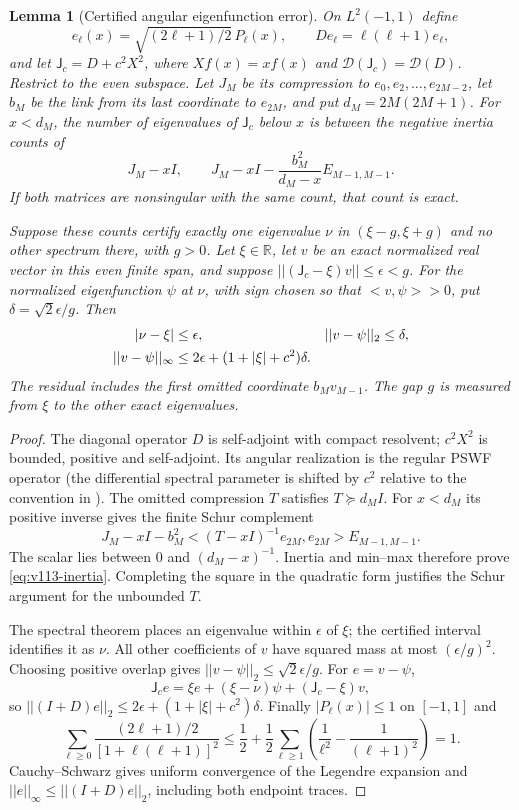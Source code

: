\documentclass[11pt]{article}
\def\norm#1{||#1||}%
\def\ip#1#2{<#1,#2>}%
\newtheorem{lemma}[theorem]{Lemma}
\theoremstyle{remark}
\newcommand{\norm}[1]{\left\lVert #1\right\rVert}
\newcommand{\ip}[2]{\left\langle #1,#2\right\rangle}
\begin{document}
\begin{lemma}[Certified angular eigenfunction error]
\label{lem:v113-angular}
On $L^2(-1,1)$ define
\[
 e_\ell(x)=\sqrt{(2\ell+1)/2}\,P_\ell(x),\qquad
 De_\ell=\ell(\ell+1)e_\ell,
\]
and let
$\mathsf J_c=D+c^2X^2$, where $Xf(x)=xf(x)$ and
$\mathcal D(\mathsf J_c)=\mathcal D(D)$.
Restrict to the even subspace. Let $J_M$ be its compression to
$e_0,e_2,\ldots,e_{2M-2}$, let $b_M$ be the link from its last
coordinate to $e_{2M}$, and put $d_M=2M(2M+1)$.
For $x<d_M$, the number of eigenvalues of $\mathsf J_c$ below $x$
is between the negative inertia counts of
\begin{equation}\label{eq:v113-inertia}
 J_M-xI,\qquad
 J_M-xI-\frac{b_M^2}{d_M-x}E_{M-1,M-1}.
\end{equation}
If both matrices are nonsingular with the same count, that count is exact.

Suppose these counts certify exactly one eigenvalue $\nu$ in
$(\xi-g,\xi+g)$ and no other spectrum there, with $g>0$.
Let $\xi\in\mathbb R$, let $v$ be an exact normalized real vector in
this even finite span, and suppose
$\norm{(\mathsf J_c-\xi)v}\le\epsilon<g$.
For the normalized eigenfunction $\psi$ at $\nu$, with sign chosen
so that $\ip v\psi>0$, put $\delta=\sqrt2\epsilon/g$.
Then
\begin{align}
 |\nu-\xi|&\le\epsilon,& \norm{v-\psi}_2&\le\delta,\notag\\
 \norm{v-\psi}_\infty
 &\le 2\epsilon+(1+|\xi|+c^2)\delta.
 \label{eq:v113-pointwise}
\end{align}
The residual includes the first omitted coordinate $b_Mv_{M-1}$.
The gap $g$ is measured from $\xi$ to the other exact eigenvalues.
\end{lemma}
\begin{proof}
The diagonal operator $D$ is self-adjoint with compact resolvent;
$c^2X^2$ is bounded, positive and self-adjoint. Its angular realization
is the regular PSWF operator (the differential spectral parameter is
shifted by $c^2$ relative to the convention in \cite{DLMFPSWF}).
The omitted compression $T$ satisfies $T\succeq d_MI$. For $x<d_M$
its positive inverse gives the finite Schur complement
\[
 J_M-xI-b_M^2\ip{(T-xI)^{-1}e_{2M}}{e_{2M}}E_{M-1,M-1}.
\]
The scalar lies between $0$ and $(d_M-x)^{-1}$. Inertia and min--max
therefore prove \eqref{eq:v113-inertia}. Completing the square in the
quadratic form justifies the Schur argument for the unbounded $T$.

The spectral theorem places an eigenvalue within $\epsilon$ of $\xi$;
the certified interval identifies it as $\nu$. All other coefficients
of $v$ have squared mass at most $(\epsilon/g)^2$. Choosing positive
overlap gives $\norm{v-\psi}_2\le\sqrt2\epsilon/g$.
For $e=v-\psi$,
\[
 \mathsf J_ce=\xi e+(\xi-\nu)\psi+(\mathsf J_c-\xi)v,
\]
so $\norm{(I+D)e}_2\le2\epsilon+(1+|\xi|+c^2)\delta$.
Finally $|P_\ell(x)|\le1$ on $[-1,1]$ and
\[
 \sum_{\ell\ge0}\frac{(2\ell+1)/2}{[1+\ell(\ell+1)]^2}
 \le\frac12+\frac12\sum_{\ell\ge1}
             \left(\frac1{\ell^2}-\frac1{(\ell+1)^2}\right)=1.
\]
Cauchy--Schwarz gives uniform convergence of the Legendre expansion and
$\norm e_\infty\le\norm{(I+D)e}_2$, including both endpoint traces.
\end{proof}
\end{document}
